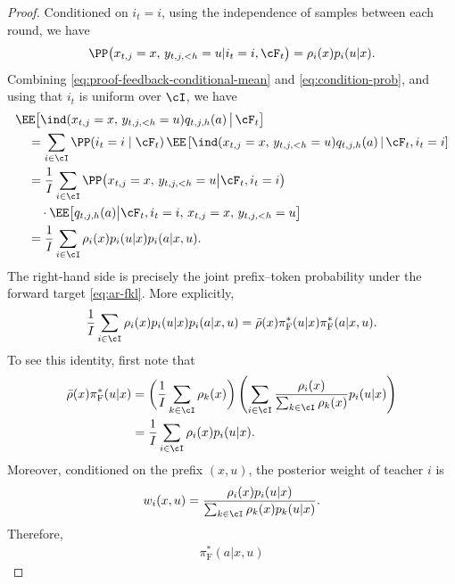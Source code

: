 \documentclass[11pt]{article}
\newcommand{\pif}{\pi_{\mathrm{F}}}
\begin{document}
\begin{proof}
Conditioned on $i_t=i$, using the independence of samples between each round, we have
\begin{align}
\label{eq:condition-prob}
    \PP\big(
        x_{t,j}=x,\,
        y_{t,j,<h}=u |
        i_t=i,\cF_t
    \big)=\rho_i(x)p_i(u|x).
\end{align}
Combining
\eqref{eq:proof-feedback-conditional-mean} and \eqref{eq:condition-prob}, and using that $i_t$ is uniform
over $\cI$, we have
\begin{align}
&\EE\big[
    \ind(x_{t,j}=x,\,y_{t,j,<h}=u)
    q_{t,j,h}(a)
    \,\big|\,
    \cF_t
\big]
\notag\\
&\quad =
\sum_{i\in\cI}
\PP(i_t=i\mid\cF_t)\,
\EE\left[
    \ind(x_{t,j}=x,\,y_{t,j,<h}=u)
    q_{t,j,h}(a)
    \,\middle|\,
    \cF_t,i_t=i
\right]
\notag\\
&\quad =
\frac{1}{I}
\sum_{i\in\cI}
\PP\big(
    x_{t,j}=x,\,
    y_{t,j,<h}=u
   \big|
    \cF_t,i_t=i
\big)
\notag\\
&\qquad\cdot
\EE\big[
    q_{t,j,h}(a)
    \big|
    \cF_t,i_t=i,\,
    x_{t,j}=x,\,
    y_{t,j,<h}=u
\big]
\notag\\
&\quad =
\frac{1}{I}
\sum_{i\in\cI}
\rho_i(x)p_i(u|x)p_i(a|x,u).
\label{eq:proof-one-rollout-mean}
\end{align}
The right-hand side is precisely the joint prefix--token probability under
the forward target \eqref{eq:ar-fkl}. More explicitly,
\begin{align}
    \frac{1}{I}
    \sum_{i\in\cI}
    \rho_i(x)p_i(u|x)p_i(a|x,u)
    =
    \bar\rho(x)
    \pif^*(u|x)
    \pif^*(a|x,u).
    \label{eq:proof-forward-joint-law}
\end{align}
To see this identity, first note that
\begin{align}
    \bar\rho(x)\pif^*(u|x)
    &=
    \bigg(
        \frac{1}{I}\sum_{k\in\cI}\rho_k(x)
    \bigg)
    \left(
        \sum_{i\in\cI}
        \frac{\rho_i(x)}
             {\sum_{k\in\cI}\rho_k(x)}
        p_i(u|x)
    \right)
    \notag\\
    &=
    \frac{1}{I}
    \sum_{i\in\cI}
    \rho_i(x)p_i(u|x).
    \label{eq:proof-forward-prefix-law}
\end{align}
Moreover, conditioned on the prefix $(x,u)$, the posterior weight of
teacher $i$ is
\begin{align*}
    w_i(x,u)
    =
    \frac{\rho_i(x)p_i(u|x)}
         {\sum_{k\in\cI}\rho_k(x)p_k(u|x)}.
\end{align*}
Therefore,
\begin{align}
    \pif^*(a|x,u)

\end{align}
\end{proof}
\end{document}
